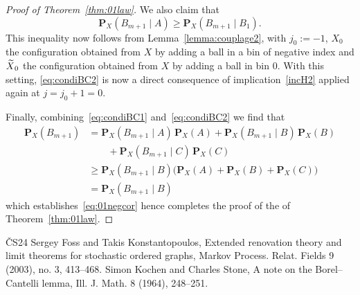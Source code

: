 \documentclass[10pt]{amsart}
\theoremstyle{definition}\newtheorem{defi}[theo]{Definition}\newtheorem{rema}[theo]{Remark}\newtheorem{exam}[theo]{Example}\newtheorem{exem}[theo]{Example}\newtheorem{nota}[theo]{Notation}
\renewcommand{\P}{\mathbf{P}}
\let\oldtilde\tilde
\renewcommand*{\tilde}[1]{\mathchoice{\widetilde{#1}}{\widetilde{#1}}{\oldtilde{#1}}{\oldtilde{#1}}}
\begin{document}
\begin{proof}[Proof of Theorem~\ref{thm:01law}]
We also claim that
\begin{equation}\label{eq:condiBC2}
\P_X(B_{m+1}\mid A) \geq \P_X(B_{m+1}\mid B_1).
\end{equation}
This inequality now follows from Lemma~\ref{lemma:couplage2}, with $j_0
:= -1$, $X_0$ the configuration obtained from $X$ by adding a ball in a bin of negative index and $\tilde{X}_0$ the configuration obtained from $X$ by adding a ball in bin $0$. With this setting, \eqref{eq:condiBC2} is now a direct consequence of implication~\eqref{incH2} applied again at $j = j_0 + 1 = 0$.

Finally, combining~\eqref{eq:condiBC1} and~\eqref{eq:condiBC2} we find that
\begin{align*}
\P_X(B_{m+1}) & = \P_X(B_{m+1}\mid A)\, \P_X(A) + \P_X(B_{m+1}\mid B)\, \P_X(B)\\
 &\qquad + \P_X(B_{m+1}\mid C)\, \P_X(C) \\
& \geq \P_X(B_{m+1}\mid B) \big(\P_X(A) + \P_X(B) + \P_X(C) \big)\\
& = \P_X(B_{m+1}\mid B)
\end{align*}
which establishes~\eqref{eq:01negcor} hence completes the proof of the of Theorem~\ref{thm:01law}.
\end{proof}
\begin{thebibliography}{ČS24}
 Sergey Foss and Takis Konstantopoulos, Extended renovation theory and limit theorems for stochastic ordered graphs, Markov Process. Relat. Fields 9 (2003), no. 3, 413–468.
 Simon Kochen and Charles Stone, A note on the Borel–Cantelli lemma, Ill. J. Math. 8 (1964), 248–251.
\end{thebibliography}
\end{document}
